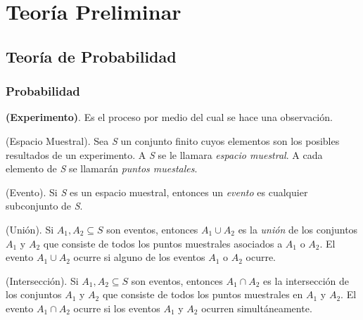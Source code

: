 \chapter{Teoría Preliminar}

\section{Teoría de Probabilidad}

\subsection{Probabilidad}

\begin{defn}\textbf{(Experimento)}. Es el proceso por medio del cual se hace una observación.
	\end{defn}

\begin{defn}(Espacio Muestral). Sea \textit{S} un conjunto finito cuyos elementos son los posibles resultados de un experimento. A \textit{S} se le llamara \textit{espacio muestral}. A cada elemento de \textit{S} se llamarán \textit{puntos muestales}.
\end{defn}

\begin{defn}(Evento). Si \textit{S} es un espacio muestral, entonces un \textit{evento} es cualquier subconjunto de \textit{S}.	
\end{defn}
	
\begin{defn}(Unión). Si \textit{$A_{1}, A_{2}\subseteq S$} son eventos, entonces \textit{$A_{1}\cup A_{2}$} es la \textit{unión} de los conjuntos \textit{$A_{1}$} y \textit{$A_{2}$} que consiste de todos los puntos muestrales asociados a \textit{$A_{1}$} o \textit{$A_{2}$}. El evento \textit{$A_{1}\cup A_{2}$} ocurre si alguno de los eventos \textit{$A_{1}$} o \textit{$A_{2}$} ocurre.	
\end{defn}


\begin{defn}(Intersección). Si \textit{$A_{1}, A_{2} \subseteq S$} son eventos, entonces \textit{$A_{1}\cap A_{2}$} es la intersección de los conjuntos \textit{$A_{1}$} y \textit{$A_{2}$} que consiste de todos los puntos muestrales en \textit{$A_{1}$} y \textit{$A_{2}$}. El evento \textit{$A_{1}\cap A_{2}$} ocurre si los eventos \textit{$A_{1}$} y \textit{$A_{2}$} ocurren simultáneamente.	
\end{defn}


